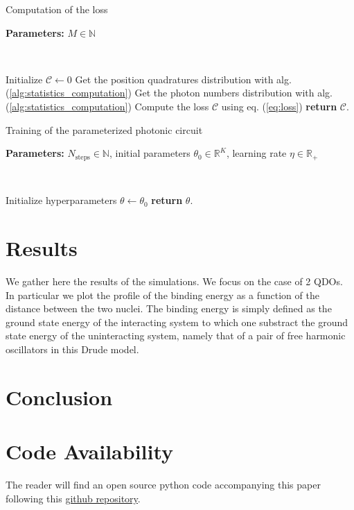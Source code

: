 \documentclass[reprint, amsmath, amssymb, aps]{revtex4-2}
\begin{document}
    \begin{algorithm}
        \caption{Computation of the loss}\label{alg:loss_computation}
            \textbf{Parameters:} $M\in\mathbb N$

            \

            Initialize $\mathcal C \gets 0$\;
            Get the position quadratures distribution with alg. (\ref{alg:statistics_computation})\;
            Get the photon numbers distribution with alg. (\ref{alg:statistics_computation})\;
            Compute the loss $\mathcal C$ using eq. (\ref{eq:loss})\;
            \textbf{return} $\mathcal C$.
    \end{algorithm}

    \begin{algorithm}
        \caption{Training of the parameterized photonic circuit}\label{alg:training}
        \textbf{Parameters:} $N_\text{steps}\in\mathbb N$, initial parameters $\theta_0\in\mathbb R^K$, learning rate $\eta\in\mathbb R_+$

        \

        Initialize hyperparameters $\theta \gets \theta_0$\;
        \textbf{return} $\theta$.
    \end{algorithm}

\section{Results}
    We gather here the results of the simulations. We focus on the case of 2 QDOs. In particular we plot the profile of the binding energy as a function of the distance between the two nuclei. The binding energy is simply defined as the ground state energy of the interacting system to which one substract the ground state energy of the uninteracting system, namely that of a pair of free harmonic oscillators in this Drude model.

\section{Conclusion}

\begin{acknowledgments}

\end{acknowledgments}

\section*{Code Availability}

The reader will find an open source python code accompanying this paper following this \href{https://github.com/MatthieuSarkis/qdo}{github repository}.

\appendix

\nocite{*}


\end{document}
